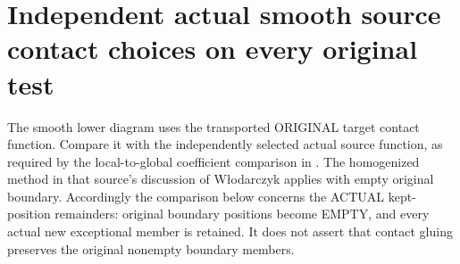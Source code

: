 \section{Independent actual smooth source contact choices on every original test}

The smooth lower diagram uses the transported ORIGINAL target contact
function. Compare it with the independently selected actual source function,
as required by the local-to-global coefficient comparison in
\cite[Sections~5 and~7]{bierstone-milman08-functoriality}.
The homogenized method in that source's discussion of W{\l}odarczyk applies
with empty original boundary. Accordingly the comparison below concerns the
ACTUAL kept-position remainders: original boundary positions become EMPTY,
and every actual new exceptional member is retained. It does not assert
that contact gluing preserves the original nonempty boundary members.

